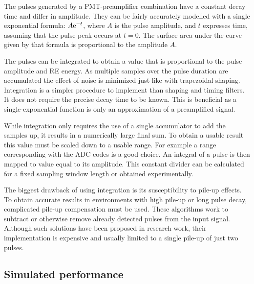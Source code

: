 The pulses generated by a PMT-preamplifier combination
have a constant decay time and differ in amplitude.
They can be fairly accurately modelled with a 
single exponential formula: $A {\rm e}^{-t}$, where $A$ is
the pulse amplitude, and $t$ expresses time, assuming that 
the pulse peak occurs at $t=0$. The surface area
under the curve given by that formula is proportional 
to the amplitude $A$.


The pulses can be integrated to obtain a value that is proportional
to the pulse amplitude and RE energy. As multiple samples
over the pulse duration are accumulated the effect of noise
is minimized just like with trapezoidal shaping.
Integration is a simpler procedure to implement
than shaping and timing filters. It does not require
the precise decay time to be known. This is beneficial 
as a single-exponential function is only an approximation 
of a preamplified signal.


While integration only requires the use of a single accumulator 
to add the samples up, it results in a numerically large final sum. 
To obtain a usable result this value must be scaled down to a usable range.
For example a range corresponding with the ADC codes is a good choice.
An integral of a pulse is then mapped to value equal to its amplitude.
This constant divider can be calculated for a fixed sampling window length
or obtained experimentally. 


The biggest drawback of using integration is its 
susceptibility to pile-up effects. To obtain accurate results
in environments with high pile-up or long pulse decay, complicated 
pile-up compensation must be used. These algorithms 
work to subtract or otherwise remove already detected pulses
from the input signal.
Although such solutions have been proposed in research work,
their implementation is expensive and usually limited to a single
pile-up of just two pulses. \cite{pileup_correction}

\subsection{Simulated performance}
